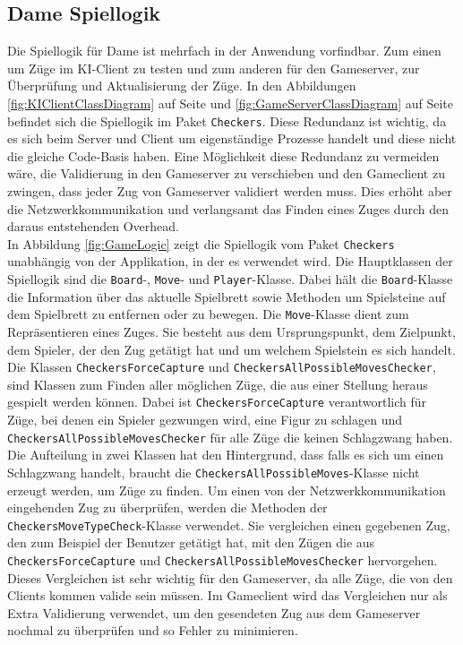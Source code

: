 \documentclass[12pt,a4paper,bibliography=totocnumbered,listof=totocnumbered]{article}
\begin{document}
\subsection{Dame Spiellogik}
\label{chap:Spiellogik}
Die Spiellogik für Dame ist mehrfach in der Anwendung vorfindbar. Zum einen um Züge im KI-Client zu testen und zum anderen
für den Gameserver, zur Überprüfung und Aktualisierung der Züge. In den Abbildungen \ref{fig:KIClientClassDiagram} auf Seite \pageref{fig:KIClientClassDiagram} 
und \ref{fig:GameServerClassDiagram} auf Seite \pageref{fig:GameServerClassDiagram}
befindet sich die Spiellogik im Paket \texttt{Checkers}. Diese Redundanz ist wichtig, da es sich beim Server und Client um eigenständige Prozesse handelt 
und diese nicht die gleiche Code-Basis haben. Eine Möglichkeit diese Redundanz zu vermeiden wäre, die Validierung in den Gameserver zu verschieben und 
den Gameclient zu zwingen, dass jeder Zug von Gameserver validiert werden muss. Dies erhöht aber die Netzwerkkommunikation und verlangsamt das Finden eines Zuges 
durch den daraus entstehenden Overhead.
\\
In Abbildung \ref{fig:GameLogic} zeigt die Spiellogik vom Paket \texttt{Checkers} unabhängig von der Applikation, in der es verwendet wird.
Die Hauptklassen der Spiellogik sind die \texttt{Board}-, \texttt{Move}- und \texttt{Player}-Klasse. Dabei hält die \texttt{Board}-Klasse die Information über das aktuelle Spielbrett sowie 
Methoden um Spielsteine auf dem Spielbrett zu entfernen oder zu bewegen. 
Die \texttt{Move}-Klasse dient zum Repräsentieren eines Zuges. Sie besteht aus dem 
Ursprungspunkt, dem Zielpunkt, dem Spieler, der den Zug getätigt hat und um welchem Spielstein es sich handelt. 
\\
Die Klassen \texttt{CheckersForceCapture} und \texttt{CheckersAllPossibleMovesChecker}, sind Klassen zum Finden aller möglichen Züge, die aus einer Stellung heraus gespielt werden
können. Dabei ist \texttt{CheckersForceCapture} verantwortlich für Züge, bei denen ein Spieler gezwungen wird, eine Figur zu schlagen und \texttt{CheckersAllPossibleMovesChecker} 
für alle Züge die keinen Schlagzwang haben. Die Aufteilung in zwei Klassen hat den Hintergrund, dass falls es sich um einen Schlagzwang handelt, braucht 
die \texttt{CheckersAllPossibleMoves}-Klasse nicht erzeugt werden, um Züge zu finden. Um einen von der Netzwerkkommunikation eingehenden Zug zu überprüfen, 
werden die Methoden der \texttt{CheckersMoveTypeCheck}-Klasse verwendet. Sie vergleichen einen gegebenen Zug, 
den zum Beispiel der Benutzer getätigt hat, mit den Zügen die aus \texttt{CheckersForceCapture} und \texttt{CheckersAllPossibleMovesChecker}
hervorgehen. Dieses Vergleichen ist sehr wichtig für den Gameserver, da alle Züge, die von den Clients kommen valide sein müssen. Im Gameclient wird das Vergleichen nur 
als Extra Validierung verwendet, um den gesendeten Zug aus dem Gameserver nochmal zu überprüfen und so Fehler zu minimieren.
\\
\end{document}

